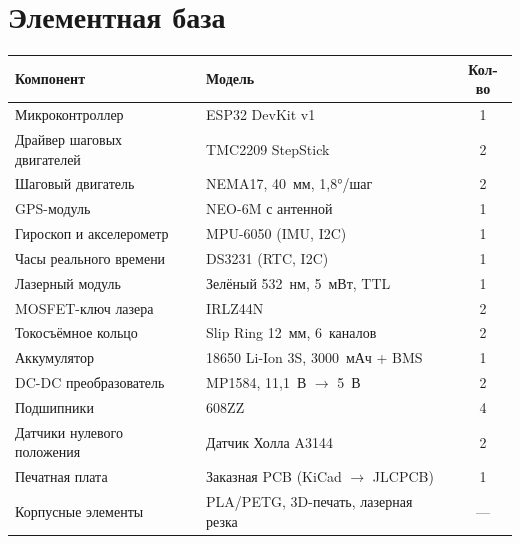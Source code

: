 \documentclass[12pt, a4paper]{article}
\begin{document}
\section*{Элементная база}

\begin{tabularx}{\textwidth}{|X|X|c|}
\hline
\textbf{Компонент} & \textbf{Модель} & \textbf{Кол-во} \\
\hline
Микроконтроллер & ESP32 DevKit v1 & 1 \\
\hline
Драйвер шаговых двигателей & TMC2209 StepStick & 2 \\
\hline
Шаговый двигатель & NEMA17, 40~мм, 1{,}8°/шаг & 2 \\
\hline
GPS-модуль & NEO-6M с антенной & 1 \\
\hline
Гироскоп и акселерометр & MPU-6050 (IMU, I2C) & 1 \\
\hline
Часы реального времени & DS3231 (RTC, I2C) & 1 \\
\hline
Лазерный модуль & Зелёный 532~нм, 5~мВт, TTL & 1 \\
\hline
MOSFET-ключ лазера & IRLZ44N & 2 \\
\hline
Токосъёмное кольцо & Slip Ring 12~мм, 6~каналов & 2 \\
\hline
Аккумулятор & 18650 Li-Ion 3S, 3000~мАч + BMS & 1 \\
\hline
DC-DC преобразователь & MP1584, 11{,}1~В $\to$ 5~В & 2 \\
\hline
Подшипники & 608ZZ & 4 \\
\hline
Датчики нулевого положения & Датчик Холла A3144 & 2 \\
\hline
Печатная плата & Заказная PCB (KiCad $\to$ JLCPCB) & 1 \\
\hline
Корпусные элементы & PLA/PETG, 3D-печать, лазерная резка & --- \\
\hline
\end{tabularx}
\end{document}
